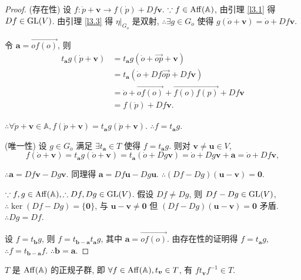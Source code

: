 \documentclass[color=black,device=normal,lang=cn,mode=geye]{elegantnote}
\begin{document}
\begin{proof}
    (存在性) 设 $f:\dot{p}+\boldsymbol{v}\to f(\dot{p})+Df\boldsymbol{v}$. $\because f\in\operatorname{Aff} (\mathbb{A})$, 由引理 \ref{l3.1} 得 $Df\in\operatorname{GL} (V)$. 由引理 \ref{l3.3} 得 $\eta|_{G_{\dot{o}}}$ 是双射, $\therefore\exists g\in G_{\dot{o}}$ 使得 $g(\dot{o}+\boldsymbol{v})=\dot{o}+Df\boldsymbol{v}$.

    令 $\boldsymbol{a}=\overrightarrow{of(o)}$, 则
    \begin{align*}
        t_{\boldsymbol{a}}g(\dot{p}+\boldsymbol{v}) & =t_{\boldsymbol{a}}g(\dot{o}+\overrightarrow{op}+\boldsymbol{v}) \\
        & =t_{\boldsymbol{a}}(\dot{o}+Df\overrightarrow{op}+Df\boldsymbol{v}) \\
        & =\dot{o}+\overrightarrow{of(o)}+\overrightarrow{f(o)f(p)}+Df\boldsymbol{v} \\
        & =f(\dot{p})+Df\boldsymbol{v}.
    \end{align*}

    $\therefore\forall\dot{p}+\boldsymbol{v}\in\mathbb{A},f(\dot{p}+\boldsymbol{v})=t_{\boldsymbol{a}}g(\dot{p}+\boldsymbol{v})$. $\therefore f=t_{\boldsymbol{a}}g$.

    (唯一性) 设 $g\in G_{\dot{o}}$ 满足 $\exists t_{\boldsymbol{a}}\in T$ 使得 $f=t_{\boldsymbol{a}}g$. 则对 $\boldsymbol{v}\neq\boldsymbol{u}\in V$,
    \[f(\dot{o}+\boldsymbol{v})=t_{\boldsymbol{a}}g(\dot{o}+\boldsymbol{v})=t_{\boldsymbol{a}}(\dot{o}+Dg\boldsymbol{v})=\dot{o}+Dg\boldsymbol{v}+\boldsymbol{a}=\dot{o}+Df\boldsymbol{v},\]

    $\therefore\boldsymbol{a}=Df\boldsymbol{v}-Dg\boldsymbol{v}$. 同理得 $\boldsymbol{a}=Df\boldsymbol{u}-Dg\boldsymbol{u}$. $\therefore(Df-Dg)(\boldsymbol{u}-\boldsymbol{v})=\boldsymbol{0}$.

    $\because f,g\in\operatorname{Aff} (\mathbb{A}),\therefore Df,Dg\in\operatorname{GL} (V)$. 假设 $Df\neq Dg$, 则 $Df-Dg\in\operatorname{GL} (V)$, $\therefore\ker(Df-Dg)=\{\boldsymbol{0}\}$, 与 $\boldsymbol{u}-\boldsymbol{v}\neq\boldsymbol{0}$ 但 $(Df-Dg)(\boldsymbol{u}-\boldsymbol{v})=\boldsymbol{0}$ 矛盾. $\therefore Dg=Df$.

    设 $f=t_{\boldsymbol{b}}g$, 则 $f=t_{\boldsymbol{b}-\boldsymbol{a}}t_{\boldsymbol{a}}g$, 其中 $\boldsymbol{a}=\overrightarrow{of(o)}$. 由存在性的证明得 $f=t_{\boldsymbol{a}}g$, $\therefore f=t_{\boldsymbol{b}-\boldsymbol{a}}f$. $\therefore\boldsymbol{b}=\boldsymbol{a}$.
\end{proof}
\begin{theorem}\label{t3.2}
    $T$ 是 $\operatorname{Aff} (\mathbb{A})$ 的正规子群, 即 $\forall f\in\operatorname{Aff} (\mathbb{A}),t_{\boldsymbol{v}}\in T$, 有 $ft_{\boldsymbol{v}}f^{-1}\in T$.
\end{theorem}
\end{document}
